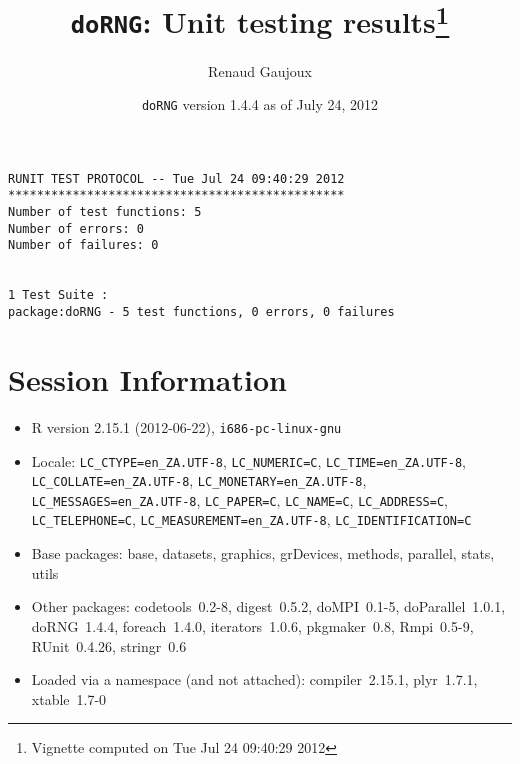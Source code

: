 \documentclass[10pt]{article}
\author{Renaud Gaujoux}
\title{\texttt{doRNG}: Unit testing results\footnote{Vignette computed  on Tue Jul 24 09:40:29 2012}}
\date{\texttt{doRNG} version 1.4.4 as of July 24, 2012}
\begin{document}
\maketitle

\begin{verbatim}
RUNIT TEST PROTOCOL -- Tue Jul 24 09:40:29 2012 
*********************************************** 
Number of test functions: 5 
Number of errors: 0 
Number of failures: 0 

 
1 Test Suite : 
package:doRNG - 5 test functions, 0 errors, 0 failures
\end{verbatim}

\section*{Session Information}
\begin{itemize}\raggedright
  \item R version 2.15.1 (2012-06-22), \verb|i686-pc-linux-gnu|
  \item Locale: \verb|LC_CTYPE=en_ZA.UTF-8|, \verb|LC_NUMERIC=C|, \verb|LC_TIME=en_ZA.UTF-8|, \verb|LC_COLLATE=en_ZA.UTF-8|, \verb|LC_MONETARY=en_ZA.UTF-8|, \verb|LC_MESSAGES=en_ZA.UTF-8|, \verb|LC_PAPER=C|, \verb|LC_NAME=C|, \verb|LC_ADDRESS=C|, \verb|LC_TELEPHONE=C|, \verb|LC_MEASUREMENT=en_ZA.UTF-8|, \verb|LC_IDENTIFICATION=C|
  \item Base packages: base, datasets, graphics, grDevices, methods,
    parallel, stats, utils
  \item Other packages: codetools~0.2-8, digest~0.5.2, doMPI~0.1-5,
    doParallel~1.0.1, doRNG~1.4.4, foreach~1.4.0, iterators~1.0.6,
    pkgmaker~0.8, Rmpi~0.5-9, RUnit~0.4.26, stringr~0.6
  \item Loaded via a namespace (and not attached): compiler~2.15.1,
    plyr~1.7.1, xtable~1.7-0
\end{itemize}
\end{document}
